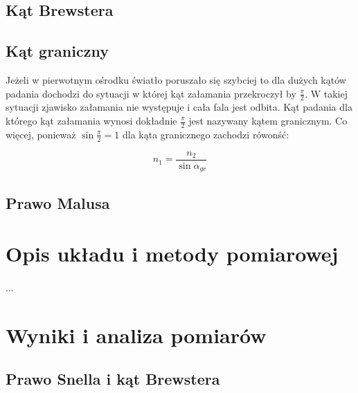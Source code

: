 \documentclass[a4paper,10pt]{article}
\begin{document}
\subsection{Kąt Brewstera}

\subsection{Kąt graniczny}
Jeżeli w pierwotnym ośrodku światło poruszało się szybciej to dla dużych kątów padania dochodzi do sytuacji
w której kąt załamania przekroczył by $\frac{\pi}{2}$. W takiej sytuacji zjawisko załamania nie występuje i cała fala jest odbita.
Kąt padania dla którego kąt załamania wynosi dokładnie $\frac{\pi}{2}$ jest nazywany kątem granicznym. Co więcej, ponieważ $\sin{\frac{\pi}{2}} = 1$
dla kąta granicznego zachodzi rówonść:

\begin{equation}
 n_1 = \frac{n_2}{\sin{\alpha_{gr}}}
\end{equation}
\subsection{Prawo Malusa}






\section{Opis układu i metody pomiarowej}

\paragraph{}...

\section{Wyniki i analiza pomiarów}
\subsection{Prawo Snella i kąt Brewstera}
\end{document}
